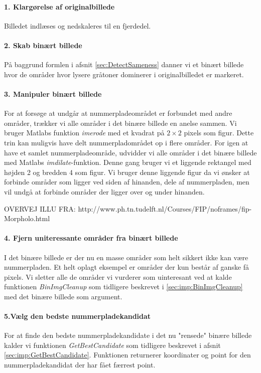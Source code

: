\paragraph{1. Klargørelse af originalbillede}
Billedet indlæses og nedskaleres til en fjerdedel. 

\paragraph{2. Skab binært billede}
På baggrund formlen i afsnit \ref{sec:DetectSameness} danner vi et binært billede hvor de områder hvor lysere gråtoner dominerer i originalbilledet er markeret.

\paragraph{3. Manipuler binært billede}
For at forsøge at undgår at nummerpladeområdet er forbundet med andre områder, trækker vi alle områder i det binære billede en anelse sammen. Vi bruger Matlabs funktion \textit{imerode} med et kvadrat på $2 \times 2$ pixels som figur. Dette trin kan muligvis have delt nummerpladområdet op i flere områder. For igen at have et samlet nummerpladeområde, udvidder vi alle områder i det binære billede med Matlabs \textit{imdilate}-funktion. Denne gang bruger vi et liggende rektangel med højden 2 og bredden 4 som figur. Vi bruger denne liggende figur da vi ønsker at forbinde områder som ligger ved siden af hinanden, dele af nummerpladen, men vil undgå at forbinde områder der ligger over og under hinanden. 

OVERVEJ ILLU FRA: http://www.ph.tn.tudelft.nl/Courses/FIP/noframes/fip-Morpholo.html

\paragraph{4. Fjern uniteressante områder fra binært billede}
I det binære billede er der nu en masse områder som helt sikkert ikke kan være nummerpladen. Et helt oplagt eksempel er områder der kun består af ganske få pixels. Vi sletter alle de områder vi vurderer som uinteresant ved at kalde funktionen \textit{BinImgCleanup} som tidligere beskrevet i \vref{sec:imp:BinImgCleanup} med det binære billede som argument.

\paragraph{5.Vælg den bedste nummerpladekandidat}
For at finde den bedste nummerpladekandidate i det nu "rensede" binære billede kalder vi funktionen \textit{GetBestCandidate} som tidligere beskrevet i afsnit \vref{sec:imp:GetBestCandidate}. Funktionen returnerer koordinater og point for den nummerpladekandidat der har fået færrest point. 

